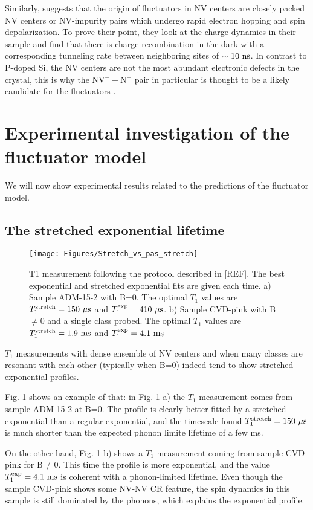 \documentclass[a4paper,11pt]{report}
\begin{document}
Similarly, \citep{choi2017depolarization} suggests that the origin of fluctuators in NV centers are closely packed NV centers or NV-impurity pairs which undergo rapid electron hopping and spin depolarization. To prove their point, they look at the charge dynamics in their sample and find that there is charge recombination in the dark with a corresponding tunneling rate between neighboring sites of $\sim 10\ \rm ns$. In contrast to P-doped Si, the NV centers are not the most abundant electronic defects in the crystal, this is why the NV$^--$N$^+$ pair in particular is thought to be a likely candidate for the fluctuators \citep{manson2018nv}.

\section{Experimental investigation of the fluctuator model}
We will now show experimental results related to the predictions of the fluctuator model.
\subsection{The stretched exponential lifetime}
\begin{figure}[h]
\centering
\texttt{[image: Figures/Stretch\_vs\_pas\_stretch]}
\caption{T1 measurement following the protocol described in [REF]. The best exponential and stretched exponential fits are given each time. a) Sample ADM-15-2 with B=0. The optimal $T_1$ values are $T_1^{\rm stretch}=150\ \mu \rm s$ and $T_1^{\rm exp}=410\ \mu \rm s$. b) Sample CVD-pink with B$\neq$0 and a single class probed. The optimal $T_1$ values are $T_1^{\rm stretch}=1.9\ \rm ms$ and $T_1^{\rm exp}=4.1\ \rm ms$}
\label{stretch_or_not_stretch}
\end{figure}
$T_1$ measurements with dense ensemble of NV centers and when many classes are resonant with each other (typically when B=0) indeed tend to show stretched exponential profiles.

Fig. \ref{stretch_or_not_stretch} shows an example of that: in Fig. \ref{stretch_or_not_stretch}-a) the $T_1$ measurement comes from sample ADM-15-2 at B=0. The profile is clearly better fitted by a stretched exponential than a regular exponential, and the timescale found $T_1^{\rm stretch}=150\ \mu \rm s$ is much shorter than the expected phonon limite lifetime of a few ms.

On the other hand, Fig. \ref{stretch_or_not_stretch}-b) shows a $T_1$ measurement coming from sample CVD-pink for B$\neq$0. This time the profile is more exponential, and the value $T_1^{\rm exp}=4.1\ \rm ms$ is coherent with a phonon-limited lifetime. Even though the sample CVD-pink shows some NV-NV CR feature, the spin dynamics in this sample is still dominated by the phonons, which explains the exponential profile.
\end{document}
